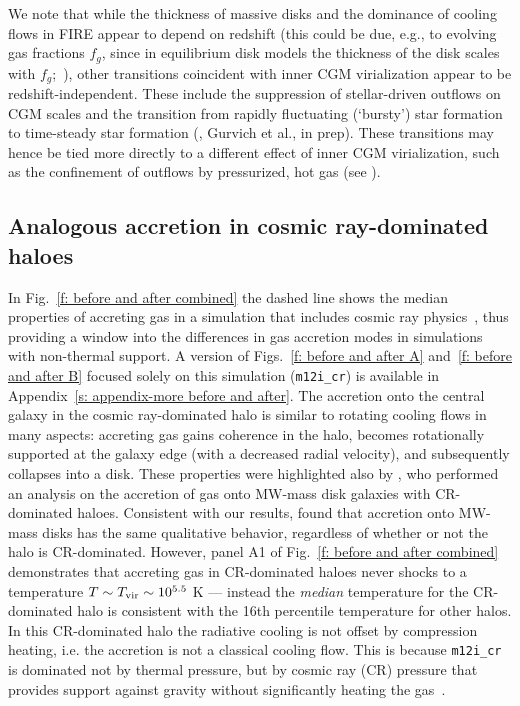 \documentclass[fleqn,usenatbib]{mnras}
\begin{document}
We note that while the thickness of massive disks and the dominance of cooling flows in FIRE appear to depend on redshift (this could be due, e.g., to evolving gas fractions $f_g$, since in equilibrium disk models the thickness of the disk scales with $f_g$;~\citealt{Thompson2005, Faucher-Giguere2013}), other transitions coincident with inner CGM virialization appear to be redshift-independent.
These include the suppression of stellar-driven outflows on CGM scales and the transition from rapidly fluctuating (`bursty') star formation to time-steady star formation (\citealt{Stern2021, Yu2021}, Gurvich et al., in prep).
These transitions may hence be tied more directly to a different effect of inner CGM virialization, such as the confinement of outflows by pressurized, hot gas (see \citealt{Stern2021}). 

\subsection{Analogous accretion in cosmic ray-dominated haloes}
\label{s: crs}

In Fig.~\ref{f: before and after combined} the dashed line shows the median properties of accreting gas in a simulation that includes cosmic ray physics~\citep[][]{Chan2019, Hopkins2020a}, thus providing a window into the differences in gas accretion modes in simulations with non-thermal support.
A version of Figs.~\ref{f: before and after A} and~\ref{f: before and after B} focused solely on this simulation (\texttt{m12i\_cr}) is available in Appendix~\ref{s: appendix-more before and after}.
The accretion onto the central galaxy in the cosmic ray-dominated halo is similar to rotating cooling flows in many aspects:
accreting gas gains coherence in the halo, becomes rotationally supported at the galaxy edge (with a decreased radial velocity), and subsequently collapses into a disk.
These properties were highlighted also by \cite{Trapp2021}, who performed an analysis on the accretion of gas onto MW-mass disk galaxies with CR-dominated haloes.
Consistent with our results, \citeauthor{Trapp2021} found that accretion onto MW-mass disks has the same qualitative behavior, regardless of whether or not the halo is CR-dominated.
However, panel A1 of Fig.~\ref{f: before and after combined} demonstrates that accreting gas in CR-dominated haloes never shocks to a temperature $T \sim T_{\rm vir} \sim 10^{5.5}$ K --- instead the \textit{median} temperature for the CR-dominated halo is consistent with the 16th percentile temperature for other halos.
In this CR-dominated halo the radiative cooling is not offset by compression heating, i.e. the accretion is not a classical cooling flow.
This is because \texttt{m12i\_cr} is dominated not by thermal pressure, but by cosmic ray (CR) pressure that provides support against gravity without significantly heating the gas~\citep{Ji2020}.
\end{document}
